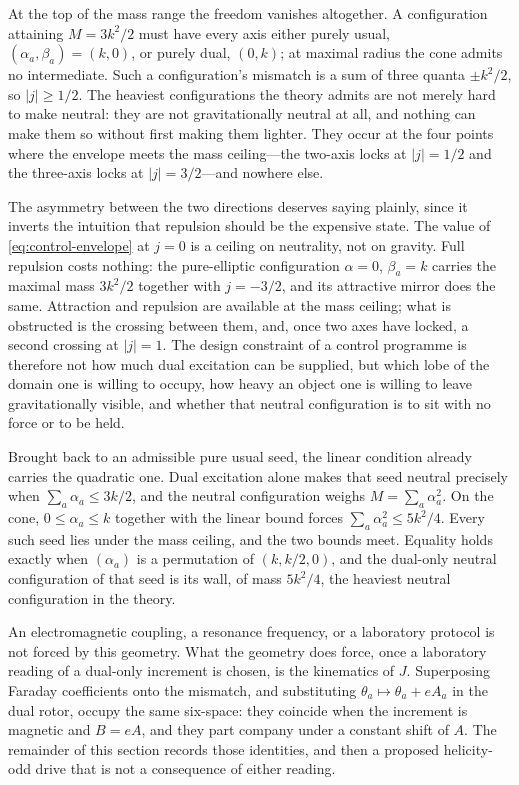 \documentclass[a4paper]{article}
\begin{document}
At the top of the mass range the freedom vanishes altogether. A configuration attaining $M=3k^2/2$ must have every axis either purely usual, $(\alpha_a,\beta_a)=(k,0)$, or purely dual, $(0,k)$; at maximal radius the cone admits no intermediate. Such a configuration's mismatch is a sum of three quanta $\pm k^2/2$, so $|j|\ge 1/2$. The heaviest configurations the theory admits are not merely hard to make neutral: they are not gravitationally neutral at all, and nothing can make them so without first making them lighter. They occur at the four points where the envelope meets the mass ceiling---the two-axis locks at $|j|=1/2$ and the three-axis locks at $|j|=3/2$---and nowhere else.

The asymmetry between the two directions deserves saying plainly, since it inverts the intuition that repulsion should be the expensive state. The value of \eqref{eq:control-envelope} at $j=0$ is a ceiling on neutrality, not on gravity. Full repulsion costs nothing: the pure-elliptic configuration $\alpha=0$, $\beta_a=k$ carries the maximal mass $3k^2/2$ together with $j=-3/2$, and its attractive mirror does the same. Attraction and repulsion are available at the mass ceiling; what is obstructed is the crossing between them, and, once two axes have locked, a second crossing at $|j|=1$. The design constraint of a control programme is therefore not how much dual excitation can be supplied, but which lobe of the domain one is willing to occupy, how heavy an object one is willing to leave gravitationally visible, and whether that neutral configuration is to sit with no force or to be held.

Brought back to an admissible pure usual seed, the linear condition already carries the quadratic one. Dual excitation alone makes that seed neutral precisely when $\sum_a\alpha_a\le 3k/2$, and the neutral configuration weighs $M=\sum_a\alpha_a^2$. On the cone, $0\le\alpha_a\le k$ together with the linear bound forces $\sum_a\alpha_a^2\le 5k^2/4$. Every such seed lies under the mass ceiling, and the two bounds meet. Equality holds exactly when $(\alpha_a)$ is a permutation of $(k,k/2,0)$, and the dual-only neutral configuration of that seed is its wall, of mass $5k^2/4$, the heaviest neutral configuration in the theory.

An electromagnetic coupling, a resonance frequency, or a laboratory protocol is not forced by this geometry. What the geometry does force, once a laboratory reading of a dual-only increment is chosen, is the kinematics of $J$. Superposing Faraday coefficients onto the mismatch, and substituting $\theta_a\mapsto\theta_a+e A_a$ in the dual rotor, occupy the same six-space: they coincide when the increment is magnetic and $B=eA$, and they part company under a constant shift of $A$. The remainder of this section records those identities, and then a proposed helicity-odd drive that is not a consequence of either reading.
\end{document}
